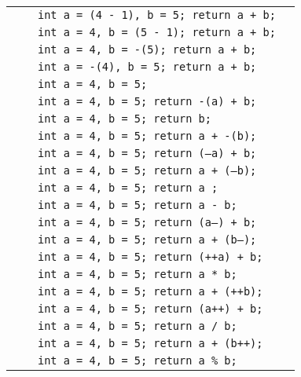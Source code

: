 \begin{longtable}{|p{1cm}|p{5cm}|p{6cm}|p{2.5cm}|}
& & \texttt{int a = (4 - 1), b = 5; return a + b;} & \\
& & \texttt{int a = 4, b = (5 - 1); return a + b;} & \\
& & \texttt{int a = 4, b = -(5); return a + b;} & \\
& & \texttt{int a = -(4), b = 5; return a + b;} & \\
& & \texttt{int a = 4, b = 5;} & \\
& & \texttt{int a = 4, b = 5; return -(a) + b;} & \\
& & \texttt{int a = 4, b = 5; return  b;} & \\
& & \texttt{int a = 4, b = 5; return a + -(b);} & \\
& & \texttt{int a = 4, b = 5; return (--a) + b;} & \\
& & \texttt{int a = 4, b = 5; return a + (--b);} & \\
& & \texttt{int a = 4, b = 5; return a ;} & \\
& & \texttt{int a = 4, b = 5; return a - b;} & \\
& & \texttt{int a = 4, b = 5; return (a--) + b;} & \\
& & \texttt{int a = 4, b = 5; return a + (b--);} & \\
& & \texttt{int a = 4, b = 5; return (++a) + b;} & \\
& & \texttt{int a = 4, b = 5; return a * b;} & \\
& & \texttt{int a = 4, b = 5; return a + (++b);} & \\
& & \texttt{int a = 4, b = 5; return (a++) + b;} & \\
& & \texttt{int a = 4, b = 5; return a / b;} & \\
& & \texttt{int a = 4, b = 5; return a + (b++);} & \\
& & \texttt{int a = 4, b = 5; return a \% b;} & \\
\hline
\end{longtable}
\normalsize
